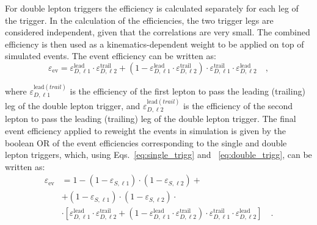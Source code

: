 For double lepton triggers the efficiency is calculated separately for each leg of the trigger. In the calculation of the efficiencies, the two trigger legs are considered independent, given that the correlations are very small. The combined efficiency is then used as a kinematics-dependent weight to be applied on top of simulated events. The event efficiency can be written as:
\begin{equation}\label{eq:double_trigg}
\varepsilon_\mathrm{ev}  = \varepsilon_{D,\ell1}^\mathrm{lead} \cdot \varepsilon_{D,\ell2}^\mathrm{trail} + (  1 -  \varepsilon_{D,\ell1}^\mathrm{lead} \cdot \varepsilon_{D,\ell2}^\mathrm{trail})\cdot\varepsilon_{D,\ell1}^\mathrm{trail} \cdot \varepsilon_{D,\ell2}^\mathrm{lead} \quad,
\end{equation}

\noindent where $\varepsilon_{D,\ell1}^{\mathrm{lead}(trail)}$ is the efficiency of the first lepton to pass the leading (trailing) leg of the double lepton trigger, and $\varepsilon_{D,\ell2}^{\mathrm{lead}(trail)}$ is the efficiency of the second lepton to pass the leading (trailing) leg of the double lepton trigger. The final event efficiency applied to reweight the events in simulation is given by the boolean OR of the event efficiencies corresponding to the single and double lepton triggers, which, using Eqs.~\eqref{eq:single_trigg} and ~\eqref{eq:double_trigg}, can be written as:
\begin{equation}
\begin{split}
\varepsilon_\mathrm{ev} & = 1 - (1-\varepsilon_{S,\ell1})\cdot(1-\varepsilon_{S,\ell2}) + \\
                     & + (1-\varepsilon_{S,\ell1})\cdot(1-\varepsilon_{S,\ell2}) \cdot \\
                     & \cdot [ \varepsilon_{D,\ell1}^\mathrm{lead} \cdot \varepsilon_{D,\ell2}^\mathrm{trail} + (  1 -  \varepsilon_{D,\ell1}^\mathrm{lead} \cdot \varepsilon_{D,\ell2}^\mathrm{trail})\cdot\varepsilon_{D,\ell1}^\mathrm{trail} \cdot \varepsilon_{D,\ell2}^\mathrm{lead} ] \quad.
\end{split}
\end{equation}




